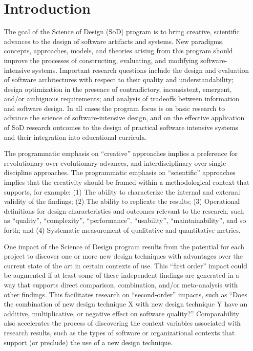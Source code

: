 
\section{Introduction}

The goal of the Science of Design (SoD) program is to bring creative,
scientific advances to the design of software artifacts and systems.  New
paradigms, concepts, approaches, models, and theories arising from this
program should improve the processes of constructing, evaluating, and
modifying software-intensive systems. Important research questions include
the design and evaluation of software architectures with respect to their
quality and understandability; design optimization in the presence of
contradictory, inconsistent, emergent, and/or ambiguous requirements; and
analysis of tradeoffs between information and software design.  In all
cases the program focus is on basic research to advance the science of
software-intensive design, and on the effective application of SoD research
outcomes to the design of practical software intensive systems and their
integration into educational curricula.

The programmatic emphasis on ``creative'' approaches implies a preference
for revolutionary over evolutionary advances, and interdisciplinary over
single discipline approaches.  The programmatic emphasis on ``scientific''
approaches implies that the creativity should be framed within a
methodological context that supports, for example: (1) The ability to
characterize the internal and external validity of the findings; (2) The
ability to replicate the results; (3) Operational definitions for design
characteristics and outcomes relevant to the research, such as ``quality'',
``complexity'', ``performance'', ``usability'', ``maintainability'', and so
forth; and (4) Systematic measurement of qualitative and quantitative
metrics.

One impact of the Science of Design program results from the potential for
each project to discover one or more new design techniques with advantages
over the current state of the art in certain contexts of use.  This ``first
order'' impact could be augmented if at least some of these independent
findings are generated in a way that supports direct comparison,
combination, and/or meta-analysis with other findings.  This
facilitates  research on ``second-order'' impacts, such as
``Does the combination of new design technique X with new design technique
Y have an additive, multiplicative, or negative effect on software
quality?''  Comparability also accelerates the process of discovering the
context variables associated with research results, such as the types of
software or organizational contexts that support (or preclude) the use of a
new design technique.

